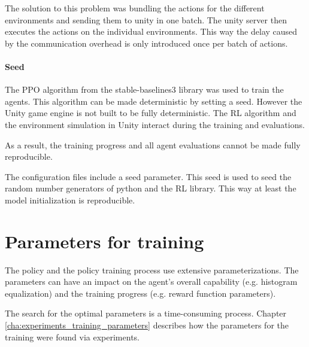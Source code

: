 The solution to this problem was bundling the actions for the different environments and sending them to unity in one batch. The unity server then executes the actions on the individual environments. This way the delay caused by the communication overhead is only introduced once per batch of actions.

\paragraph{Seed}

The \ac{PPO} algorithm from the stable-baselines3 library was used to train the agents. This algorithm can be made deterministic by setting a seed. However the Unity game engine is not built to be fully deterministic. The \ac{RL} algorithm and the environment simulation in Unity interact during the training and evaluations. 

As a result, the training progress and all agent evaluations cannot be made fully reproducible.

The configuration files include a seed parameter. This seed is used to seed the random number generators of python and the \ac{RL} library. This way at least the model initialization is reproducible.

\section{Parameters for training}

The policy and the policy training process use extensive parameterizations. The parameters can have an impact on the agent's overall capability (e.g. histogram equalization) and the training progress (e.g. reward function parameters).

The search for the optimal parameters is a time-consuming process. Chapter \ref{cha:experiments_training_parameters} describes how the parameters for the training were found via experiments.


